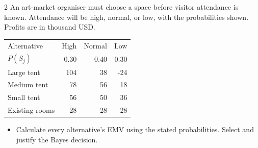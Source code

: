 \begin{multicols}{2}
An art-market organiser must choose a space before visitor attendance is known. Attendance will be high, normal, or low, with the probabilities shown. Profits are in thousand USD.
\begin{center}\small\setlength{\tabcolsep}{4pt}
\begin{tabular}{@{}lrrr@{}}\toprule
Alternative&High&Normal&Low\\
$P(S_j)$&0.30&0.40&0.30\\\midrule
Large tent&104&38&-24\\
Medium tent&78&56&18\\
Small tent&56&50&36\\
Existing rooms&28&28&28\\\bottomrule
\end{tabular}\end{center}
\begin{itemize}\item[\textbf{(C6)}] Calculate every alternative's EMV using the stated probabilities. Select and justify the Bayes decision. \end{itemize}
\end{multicols}
\clearpage
